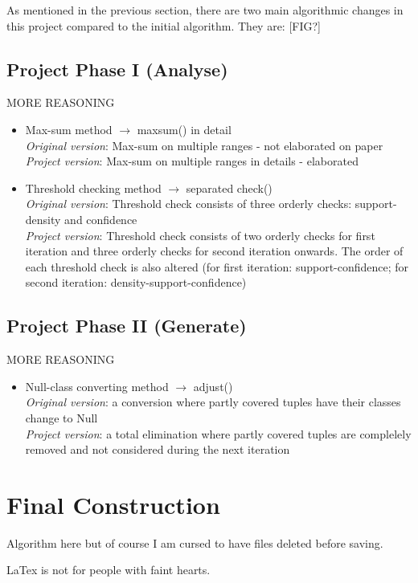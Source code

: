 As mentioned in the previous section, there are two main algorithmic changes in this project compared to the initial algorithm. They are:
[FIG?]

\subsection{Project Phase I (Analyse)} MORE REASONING

\begin{itemize}
	\item Max-sum method $\rightarrow$ maxsum() in detail \\
	\textit{Original version}: Max-sum on multiple ranges - not elaborated on paper \\
	\textit{Project version}: Max-sum on multiple ranges in details - elaborated \\

	\item Threshold checking method $\rightarrow$ separated check() \\
	\textit{Original version}: Threshold check consists of three orderly checks: support-density and confidence \\
	\textit{Project version}: Threshold check consists of two orderly checks for first iteration and three orderly checks for second iteration onwards. The order of each threshold check is also altered (for first iteration: support-confidence; for second iteration: density-support-confidence) \\
\end{itemize}

\subsection{Project Phase II (Generate)} MORE REASONING

\begin{itemize}
	\item Null-class converting method $\rightarrow$ adjust() \\
	\textit{Original version}: a conversion where partly covered tuples have their classes change to Null \\
	\textit{Project version}: a total elimination where partly covered tuples are complelely removed and not considered during the next iteration \\
\end{itemize}


\section{Final Construction}

Algorithm here but of course I am cursed to have files deleted before saving.

LaTex is not for people with faint hearts. 


